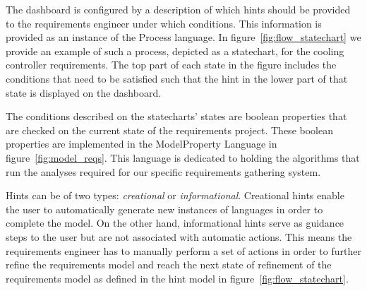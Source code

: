 The dashboard is configured by a description of which hints should be
provided to the requirements engineer under which conditions. This information
is provided as an instance of the \textsf{Process} language.
In figure~\ref{fig:flow_statechart} we provide an example of such a process,
depicted as a statechart, for the	cooling controller requirements.  
The top part of each state in the figure includes the conditions that need to be satisfied such that the hint in the lower part of
that state is displayed on the dashboard. 

The conditions described on the statecharts' states are boolean properties that
are checked on the current state of the requirements project. These boolean
properties are implemented in the \textsf{ModelProperty} Language in
figure~\ref{fig:model_reqs}. This language is dedicated to holding the
algorithms that run the analyses required for our specific requirements
gathering system.


Hints can be of two types: \emph{creational} or \emph{informational}.
Creational hints enable the user to automatically generate new instances of
languages in order to complete the model. On the other hand, informational hints
serve as guidance steps to the user but are not associated with automatic
actions. This means the requirements engineer has to manually perform a set of
actions in order to further refine the requirements model and reach the next
state of refinement of the requirements model as defined in the hint model in
figure~\ref{fig:flow_statechart}. 




